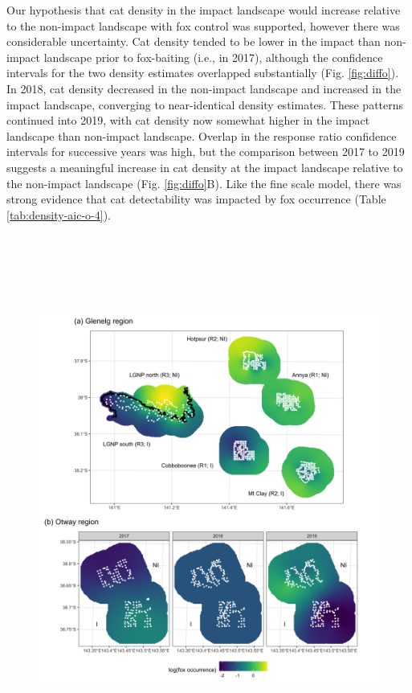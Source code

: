 \documentclass[11pt,a4paper,titlepage,twoside,openright]{style/unimelbthesis}
\begin{document}
\begin{mainmatter}
Our hypothesis that cat density in the impact landscape would increase relative to the non-impact landscape with fox control was supported, however there was considerable uncertainty. Cat density tended to be lower in the impact than non-impact landscape prior to fox-baiting (i.e., in 2017), although the confidence intervals for the two density estimates overlapped substantially (Fig. \ref{fig:diffo}). In 2018, cat density decreased in the non-impact landscape and increased in the impact landscape, converging to near-identical density estimates. These patterns continued into 2019, with cat density now somewhat higher in the impact landscape than non-impact landscape. Overlap in the response ratio confidence intervals for successive years was high, but the comparison between 2017 to 2019 suggests a meaningful increase in cat density at the impact landscape relative to the non-impact landscape (Fig. \ref{fig:diffo}B). Like the fine scale model, there was strong evidence that cat detectability was impacted by fox occurrence (Table \ref{tab:density-aic-o-4}).

\newpage

\(~\)

\(~\)

\(~\)
\begin{figure}

{\centering \includegraphics[width=1\linewidth]{figure/c3/fig2_600dpi} 

}
\end{figure}
\end{mainmatter}
\end{document}
